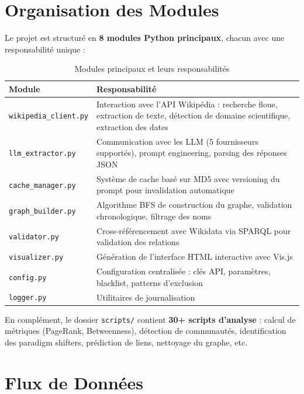 \documentclass[12pt,a4paper]{report}
\begin{document}
\section{Organisation des Modules}

Le projet est structuré en \textbf{8 modules Python principaux}, chacun avec une responsabilité unique :

\begin{table}[H]
\centering
\begin{tabular}{|l|p{9cm}|}
\hline
\rowcolor{ice500!20}
\textbf{Module} & \textbf{Responsabilité} \\
\hline
\texttt{wikipedia\_client.py} & Interaction avec l'API Wikipédia : recherche floue, extraction de texte, détection de domaine scientifique, extraction des dates \\
\hline
\texttt{llm\_extractor.py} & Communication avec les LLM (5 fournisseurs supportés), prompt engineering, parsing des réponses JSON \\
\hline
\texttt{cache\_manager.py} & Système de cache basé sur MD5 avec versioning du prompt pour invalidation automatique \\
\hline
\texttt{graph\_builder.py} & Algorithme BFS de construction du graphe, validation chronologique, filtrage des noms \\
\hline
\texttt{validator.py} & Cross-référencement avec Wikidata via SPARQL pour validation des relations \\
\hline
\texttt{visualizer.py} & Génération de l'interface HTML interactive avec Vis.js \\
\hline
\texttt{config.py} & Configuration centralisée : clés API, paramètres, blacklist, patterns d'exclusion \\
\hline
\texttt{logger.py} & Utilitaires de journalisation \\
\hline
\end{tabular}
\caption{Modules principaux et leurs responsabilités}
\end{table}

En complément, le dossier \texttt{scripts/} contient \textbf{30+ scripts d'analyse} : calcul de métriques (PageRank, Betweenness), détection de communautés, identification des paradigm shifters, prédiction de liens, nettoyage du graphe, etc.

\section{Flux de Données}
\end{document}
